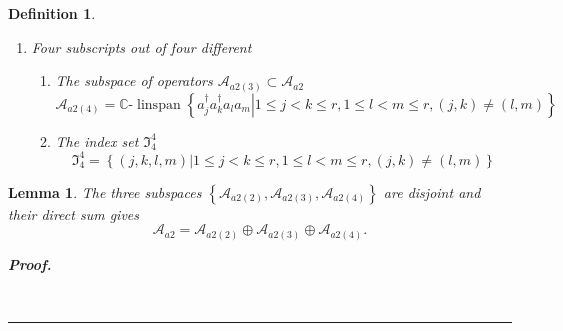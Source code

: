 \documentclass[aps,preprint]{revtex4}%
\newtheorem{definition}[theorem]{Definition}
\newtheorem{lemma}[theorem]{Lemma}
\newenvironment{proof}[1][Proof]{\noindent\textbf{#1.} }{\ \rule{0.5em}{0.5em}}
\begin{document}
\begin{definition}
\begin{enumerate}
\begin{enumerate}
\end{enumerate}

\item Four subscripts out of four different

\begin{enumerate}
\item The subspace of operators $\mathcal{A}_{a2\left(  3\right)  }%
\subset\mathcal{A}_{a2}$%
\begin{equation}
\mathcal{A}_{a2\left(  4\right)  }=\mathbb{C}\text{-}\operatorname{linspan}%
\left\{  \left.  a_{j}^{\dagger}a_{k}^{\dagger}a_{l}a_{m}\right\vert 1\leq
j<k\leq r,1\leq l<m\leq r,\left(  j,k\right)  \neq\left(  l,m\right)
\right\}
\end{equation}


\item The index set $\mathfrak{I}_{4}^{4}$%
\begin{equation}
\mathfrak{I}_{4}^{4}=\left\{  \left.  \left(  j,k,l,m\right)  \right\vert
1\leq j<k\leq r,1\leq l<m\leq r,\left(  j,k\right)  \neq\left(  l,m\right)
\right\}
\end{equation}

\end{enumerate}
\end{enumerate}
\end{definition}

\begin{lemma}
The three subspaces $\left\{  \mathcal{A}_{a2\left(  2\right)  }%
,\mathcal{A}_{a2\left(  3\right)  },\mathcal{A}_{a2\left(  4\right)
}\right\}  $ are disjoint and their direct sum gives
\begin{equation}
\mathcal{A}_{a2}=\mathcal{A}_{a2\left(  2\right)  }\oplus\mathcal{A}%
_{a2\left(  3\right)  }\oplus\mathcal{A}_{a2\left(  4\right)  }.
\end{equation}


\begin{proof}

\end{proof}
\end{lemma}
\end{document}
